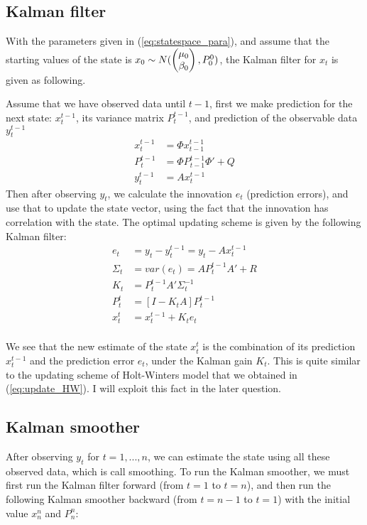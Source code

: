\subsection{Kalman filter}
With the parameters given in (\ref{eq:statespace_para}), and assume that the starting values of the state is $x_0 \sim N(\colvec{\mu_0}{\beta_0}, P_0^0)$, the Kalman filter for $x_t$ is given as following.

Assume that we have observed data until $t-1$, first we make prediction for the next state: $x^{t-1}_t$, its variance matrix $P^{t-1}_t$, and prediction of the observable data $y^{t-1}_{t}$
\begin{equation}
\begin{split}
x^{t-1}_t &= \Phi x^{t-1}_{t-1}\\
P^{t-1}_t &= \Phi P^{t-1}_{t-1}\Phi'+Q\\
y^{t-1}_t &= Ax^{t-1}_t
\end{split}
\end{equation}
Then after observing $y_t$, we calculate the innovation $e_t$ (prediction errors), and use that to update the state vector, using the fact that the innovation has correlation with the state. The optimal updating scheme is given by the following Kalman filter:
\begin{equation} \label{eq:Kalman_filter}
\begin{split}
e_t &= y_t - y^{t-1}_t = y_t - Ax^{t-1}_t \\
\Sigma_t &= var(e_t) = AP^{t-1}_{t}A'+ R \\
K_t &= P^{t-1}_tA'\Sigma_t^{-1}\\
P^t_t &= [I - K_tA]P^{t-1}_t\\
x^t_t &= x^{t-1}_t + K_te_t\\
\end{split}
\end{equation}

We see that the new estimate of the state $x^t_t$ is the combination of its prediction $x^{t-1}_{t}$ and the prediction error $e_t$, under the Kalman gain $K_t$. This is quite similar to the updating scheme of Holt-Winters model that we obtained in (\ref{eq:update_HW}). I will exploit this fact in the later question.
\subsection{Kalman smoother}
After observing $y_t$ for $t = 1, ..., n$, we can estimate the state using all these observed data, which is call smoothing. To run the Kalman smoother, we must first run the Kalman filter forward (from $t=1$ to $t=n$), and then run the following Kalman smoother backward (from $t=n-1$ to $t=1$) with the initial value $x^n_n$ and $P^n_n$:

